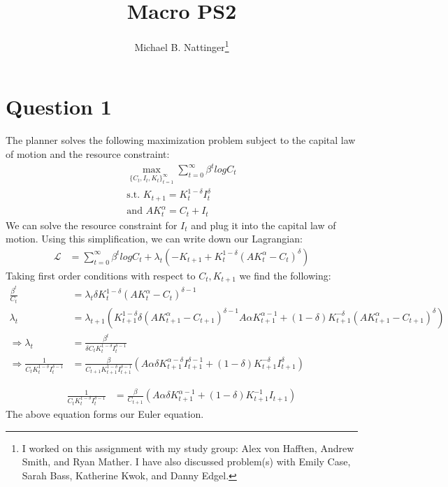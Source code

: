 \documentclass[11pt]{article} %
\title{Macro PS2}
\author{Michael B. Nattinger\footnote{I worked on this assignment with my study group: Alex von Hafften, Andrew Smith, and Ryan Mather. I have also discussed problem(s) with Emily Case, Sarah Bass, Katherine Kwok, and Danny Edgel.}}
\begin{document}
\maketitle
\section{Question 1}
The planner solves the following maximization problem subject to the capital law of motion and the resource constraint:
\begin{align*}
\max_{\{ C_t,I_t, K_t\}_{t=1}^{\infty}} \sum_{t=0}^{\infty} \beta^t log C_t\\
\text{s.t. } K_{t+1} = K_t^{1-\delta}I_t^{\delta}\\
\text{and } AK_t^{\alpha} = C_t + I_t
\end{align*}
We can solve the resource constraint for $I_t$ and plug it into the capital law of motion. Using this simplification, we can write down our Lagrangian:
\begin{align*}
\mathcal{L} &= \sum_{t=0}^{\infty} \beta^t log C_t + \lambda_t\left(-K_{t+1}+ K_t^{1-\delta}\left( AK_t^{\alpha}  - C_t \right)^{\delta}\right)
\end{align*}
Taking first order conditions with respect to $C_t,K_{t+1}$ we find the following:
\begin{align*}
\frac{\beta^t}{C_t} &= \lambda_t \delta K_t^{1-\delta}(AK_t^{\alpha}  - C_t )^{\delta - 1}\\
\lambda_t &= \lambda_{t+1}(K_{t+1}^{1-\delta}\delta(AK_{t+1}^{\alpha}  - C_{t+1} )^{\delta - 1}A\alpha K_{t+1}^{\alpha - 1} + (1-\delta)K_{t+1}^{-\delta} \left( AK_{t+1}^{\alpha}  - C_{t+1} \right)^{\delta})\\
\Rightarrow \lambda_t &= \frac{\beta^t}{\delta C_tK_t^{1-\delta}I_t^{\delta - 1}} \\
\Rightarrow  \frac{1}{C_tK_t^{1-\delta}I_t^{\delta - 1}}  &=  \frac{\beta}{C_{t+1}K_{t+1}^{1-\delta}I_{t+1}^{\delta - 1}}(A\alpha \delta K_{t+1}^{\alpha - \delta}I_{t+1}^{\delta - 1} + (1-\delta)K_{t+1}^{-\delta}I_{t+1}^{\delta})
\end{align*}

\begin{align}
\frac{1}{C_tK_t^{1-\delta}I_t^{\delta - 1}}  &= \frac{\beta}{C_{t+1}}(A\alpha \delta K_{t+1}^{\alpha - 1} + (1-\delta)K_{t+1}^{-1}I_{t+1}) \label{eul}
\end{align}
The above equation forms our Euler equation.
\end{document}
